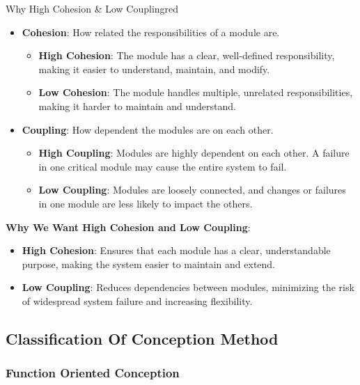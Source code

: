\begin{prettyBox}{Why High Cohesion \& Low Coupling}{red}
    \begin{itemize}
        \item \textbf{Cohesion}: How related the responsibilities of a module are.
            \begin{itemize}
                \item \textbf{High Cohesion}: The module has a clear, well-defined responsibility, making it easier to understand, maintain, and modify.
                \item \textbf{Low Cohesion}: The module handles multiple, unrelated responsibilities, making it harder to maintain and understand.
            \end{itemize}
        \item \textbf{Coupling}: How dependent the modules are on each other.
            \begin{itemize}
                \item \textbf{High Coupling}: Modules are highly dependent on each other. A failure in one critical module may cause the entire system to fail.
                \item \textbf{Low Coupling}: Modules are loosely connected, and changes or failures in one module are less likely to impact the others.
            \end{itemize}
    \end{itemize}
    
    \textbf{Why We Want High Cohesion and Low Coupling}:
    \begin{itemize}
        \item \textbf{High Cohesion}: Ensures that each module has a clear, understandable purpose, making the system easier to maintain and extend.
        \item \textbf{Low Coupling}: Reduces dependencies between modules, minimizing the risk of widespread system failure and increasing flexibility.
    \end{itemize}
\end{prettyBox}


\vspace{0.5cm}

\subsection{Classification Of Conception Method}

\vspace{0.25cm}
\subsubsection{Function Oriented Conception}

